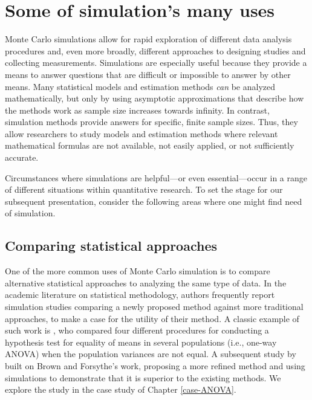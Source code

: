 \documentclass[
]{book}
\begin{document}
\section{Some of simulation's many uses}\label{some-of-simulations-many-uses}

Monte Carlo simulations allow for rapid exploration of different data analysis procedures and, even more broadly, different approaches to designing studies and collecting measurements. Simulations are especially useful because they provide a means to answer questions that are difficult or impossible to answer by other means.
Many statistical models and estimation methods \emph{can} be analyzed mathematically, but only by using asymptotic approximations that describe how the methods work as sample size increases towards infinity.
In contrast, simulation methods provide answers for specific, finite sample sizes.
Thus, they allow researchers to study models and estimation methods where relevant mathematical formulas are not available, not easily applied, or not sufficiently accurate.

Circumstances where simulations are helpful---or even essential---occur in a range of different situations within quantitative research.
To set the stage for our subsequent presentation, consider the following areas where one might find need of simulation.

\subsection{Comparing statistical approaches}\label{comparing-statistical-approaches}

One of the more common uses of Monte Carlo simulation is to compare alternative statistical approaches to analyzing the same type of data.
In the academic literature on statistical methodology, authors frequently report simulation studies comparing a newly proposed method against more traditional approaches, to make a case for the utility of their method.
A classic example of such work is \citet{brown1974SmallSampleBehavior}, who compared four different procedures for conducting a hypothesis test for equality of means in several populations (i.e., one-way ANOVA) when the population variances are not equal.
A subsequent study by \citet{mehrotra1997ImprovingBrownforsytheSolution} built on Brown and Forsythe's work, proposing a more refined method and using simulations to demonstrate that it is superior to the existing methods.
We explore the \citet{brown1974SmallSampleBehavior} study in the case study of Chapter \ref{case-ANOVA}.
\end{document}
